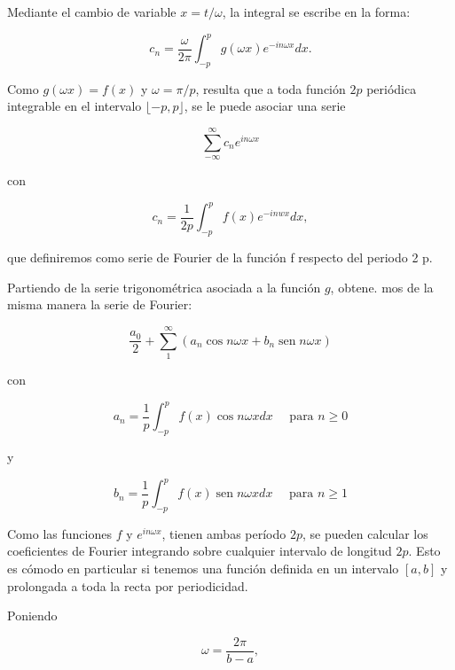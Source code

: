\documentclass[10pt]{article}
\theoremstyle{plain}
\theoremstyle{definition}
\theoremstyle{remark}
\begin{document}
Mediante el cambio de variable $x=t / \omega$, la integral se escribe en la forma:

$$
c_{n}=\frac{\omega}{2 \pi} \int_{-p}^{p} g(\omega x) e^{-i n \omega x} d x .
$$

Como $g(\omega x)=f(x)$ y $\omega=\pi / p$, resulta que a toda función $2 p$ periódica integrable en el intervalo $\lfloor-p, p\rfloor$, se le puede asociar una serie


\begin{equation*}
\sum_{-\infty}^{\infty} c_{n} e^{i n \omega x} \tag{5.25}
\end{equation*}


con


\begin{equation*}
c_{n}=\frac{1}{2 p} \int_{-p}^{p} f(x) e^{-i n w x} d x, \tag{5.26}
\end{equation*}



que definiremos como serie de Fourier de la función f respecto del periodo 2 p.

Partiendo de la serie trigonométrica asociada a la función $g$, obtene. mos de la misma manera la serie de Fourier:


\begin{equation*}
\frac{a_{0}}{2}+\sum_{1}^{\infty}\left(a_{n} \cos n \omega x+b_{n} \operatorname{sen} n \omega x\right) \tag{5-27}
\end{equation*}


con


\begin{equation*}
a_{n}=\frac{1}{p} \int_{-p}^{p} f(x) \cos n \omega x d x \quad \text { para } n \geqslant 0 \tag{5-28}
\end{equation*}


y


\begin{equation*}
b_{n}=\frac{1}{p} \int_{-p}^{p} f(x) \operatorname{sen} n \omega x d x \quad \text { para } n \geqslant 1 \tag{5-29}
\end{equation*}


Como las funciones $f$ y $e^{i n \omega x}$, tienen ambas período $2 p$, se pueden calcular los coeficientes de Fourier integrando sobre cualquier intervalo de longitud $2 p$. Esto es cómodo en particular si tenemos una función definida en un intervalo $[a, b]$ y prolongada a toda la recta por periodicidad.

Poniendo

$$
\omega=\frac{2 \pi}{b-a},
$$
\end{document}
